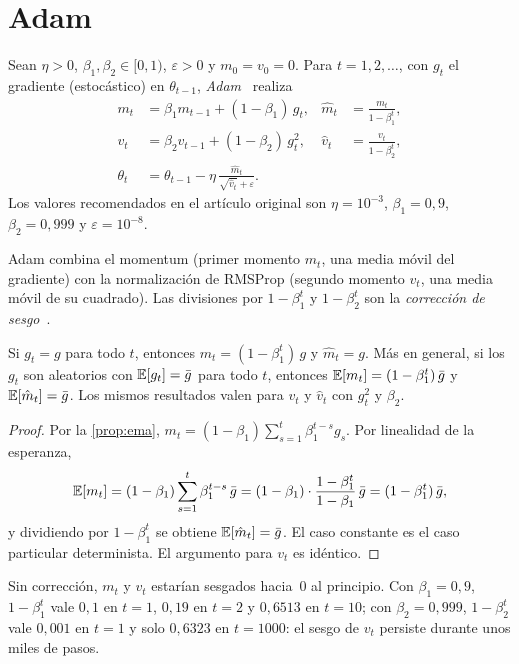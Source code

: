 \section{Adam}

\begin{definicion}[Adam]\label{def:adam}
Sean $\eta>0$, $\beta_1,\beta_2\in[0,1)$, $\varepsilon>0$ y $m_0=v_0=0$. Para $t=1,2,\dots$, con $g_t$ el gradiente (estocástico) en $\theta_{t-1}$, \emph{Adam}~\cite[algoritmo~1]{adam} realiza
\begin{align*}
m_t&=\beta_1m_{t-1}+(1-\beta_1)\,g_t, & \hat m_t&=\frac{m_t}{1-\beta_1^{t}},\\
v_t&=\beta_2v_{t-1}+(1-\beta_2)\,g_t^{2}, & \hat v_t&=\frac{v_t}{1-\beta_2^{t}},\\
\theta_t&=\theta_{t-1}-\eta\,\frac{\hat m_t}{\sqrt{\hat v_t}+\varepsilon}.
\end{align*}
Los valores recomendados en el artículo original son $\eta=10^{-3}$, $\beta_1=0{,}9$, $\beta_2=0{,}999$ y $\varepsilon=10^{-8}$.
\end{definicion}

Adam combina el momentum (primer momento $m_t$, una media móvil del gradiente) con la normalización de RMSProp (segundo momento $v_t$, una media móvil de su cuadrado). Las divisiones por $1-\beta_1^{t}$ y $1-\beta_2^{t}$ son la \emph{corrección de sesgo}~\cite[§3]{adam}.

\begin{proposicion}\label{prop:sesgo}
Si $g_t=g$ para todo $t$, entonces $m_t=(1-\beta_1^{t})\,g$ y $\hat m_t=g$. Más en general, si los $g_t$ son aleatorios con $\mathbb{E}[g_t]=\bar g$ para todo $t$, entonces $\mathbb{E}[m_t]=(1-\beta_1^{t})\,\bar g$ y $\mathbb{E}[\hat m_t]=\bar g$. Los mismos resultados valen para $v_t$ y $\hat v_t$ con $g_t^{2}$ y $\beta_2$.
\end{proposicion}

\begin{proof}
Por la \cref{prop:ema}, $m_t=(1-\beta_1)\sum_{s=1}^{t}\beta_1^{t-s}g_s$. Por linealidad de la esperanza,
\[
\mathbb{E}[m_t]=(1-\beta_1)\sum_{s=1}^{t}\beta_1^{t-s}\,\bar g=(1-\beta_1)\cdot\frac{1-\beta_1^{t}}{1-\beta_1}\,\bar g=(1-\beta_1^{t})\,\bar g,
\]
y dividiendo por $1-\beta_1^{t}$ se obtiene $\mathbb{E}[\hat m_t]=\bar g$. El caso constante es el caso particular determinista. El argumento para $v_t$ es idéntico.
\end{proof}

Sin corrección, $m_t$ y $v_t$ estarían sesgados hacia~0 al principio. Con $\beta_1=0{,}9$, $1-\beta_1^{t}$ vale $0{,}1$ en $t=1$, $0{,}19$ en $t=2$ y $0{,}6513$ en $t=10$; con $\beta_2=0{,}999$, $1-\beta_2^{t}$ vale $0{,}001$ en $t=1$ y solo $0{,}6323$ en $t=1000$: el sesgo de $v_t$ persiste durante unos miles de pasos.

